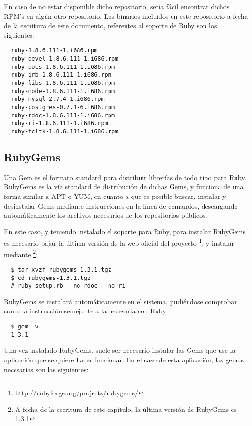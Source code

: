 En caso de no estar disponible dicho repositorio, sería fácil encontrar dichos RPM's en algún otro repositorio. Los binarios incluidos en este repositorio a fecha de la escritura de este documento, referentes al soporte de Ruby son los siguientes:

\begin{verbatim}
  ruby-1.8.6.111-1.i686.rpm
  ruby-devel-1.8.6.111-1.i686.rpm
  ruby-docs-1.8.6.111-1.i686.rpm
  ruby-irb-1.8.6.111-1.i686.rpm
  ruby-libs-1.8.6.111-1.i686.rpm
  ruby-mode-1.8.6.111-1.i686.rpm
  ruby-mysql-2.7.4-1.i686.rpm
  ruby-postgres-0.7.1-6.i686.rpm
  ruby-rdoc-1.8.6.111-1.i686.rpm
  ruby-ri-1.8.6.111-1.i686.rpm
  ruby-tcltk-1.8.6.111-1.i686.rpm
\end{verbatim}



\subsection{RubyGems} %
\label{sub:rubygems}

Una Gem es el formato standard para distribuir librerías de todo tipo para Ruby. RubyGems es la vía standard de distribución de dichas Gems, y funciona de una forma similar a APT o YUM, en cuanto a que es posible buscar, instalar y desinstalar Gems mediante instrucciones en la línea de comandos, descargando automáticamente los archivos necesarios de los repositorios públicos.

En este caso, y teniendo instalado el soporte para Ruby, para instalar RubyGems es necesario bajar la última versión de la web oficial del proyecto \footnote{http://rubyforge.org/projects/rubygems/}, y instalar mediante \footnote{A fecha de la escritura de este capítulo, la última versión de RubyGems es 1.3.1}:

\begin{verbatim}
  $ tar xvzf rubygems-1.3.1.tgz
  $ cd rubygems-1.3.1.tgz
  # ruby setup.rb --no-rdoc --no-ri
\end{verbatim}

RubyGems se instalará automáticamente en el sistema, pudiéndose comprobar con una instrucción semejante a la necesaria con Ruby:

\begin{verbatim}
  $ gem -v
  1.3.1
\end{verbatim}

Una vez instalado RubyGems, suele ser necesario instalar las Gems que use la aplicación que se quiere hacer funcionar. En el caso de esta aplicación, las gemas necesarias son las siguientes:

